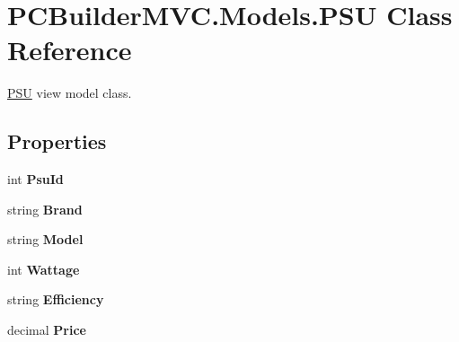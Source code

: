 \hypertarget{class_p_c_builder_m_v_c_1_1_models_1_1_p_s_u}{}\section{P\+C\+Builder\+M\+V\+C.\+Models.\+P\+SU Class Reference}
\label{class_p_c_builder_m_v_c_1_1_models_1_1_p_s_u}


\hyperlink{class_p_c_builder_m_v_c_1_1_models_1_1_p_s_u}{P\+SU} view model class.  


\subsection*{Properties}
\begin{DoxyCompactItemize}
\item 
int {\bfseries Psu\+Id}\hypertarget{class_p_c_builder_m_v_c_1_1_models_1_1_p_s_u_a1aa8f13f4f65fac57188abd27fec6361}{}\label{class_p_c_builder_m_v_c_1_1_models_1_1_p_s_u_a1aa8f13f4f65fac57188abd27fec6361}

\item 
string {\bfseries Brand}\hypertarget{class_p_c_builder_m_v_c_1_1_models_1_1_p_s_u_a6a4566057f3f1faa0a76b7523f6381b5}{}\label{class_p_c_builder_m_v_c_1_1_models_1_1_p_s_u_a6a4566057f3f1faa0a76b7523f6381b5}

\item 
string {\bfseries Model}\hypertarget{class_p_c_builder_m_v_c_1_1_models_1_1_p_s_u_ad1ce3afa398e0d81611614408e3e504c}{}\label{class_p_c_builder_m_v_c_1_1_models_1_1_p_s_u_ad1ce3afa398e0d81611614408e3e504c}

\item 
int {\bfseries Wattage}\hypertarget{class_p_c_builder_m_v_c_1_1_models_1_1_p_s_u_a1003235ba50a1a9cdce50d9e985db3d9}{}\label{class_p_c_builder_m_v_c_1_1_models_1_1_p_s_u_a1003235ba50a1a9cdce50d9e985db3d9}

\item 
string {\bfseries Efficiency}\hypertarget{class_p_c_builder_m_v_c_1_1_models_1_1_p_s_u_a3a2bf09667c2d0c6b9c44de0f9464a73}{}\label{class_p_c_builder_m_v_c_1_1_models_1_1_p_s_u_a3a2bf09667c2d0c6b9c44de0f9464a73}

\item 
decimal {\bfseries Price}\hypertarget{class_p_c_builder_m_v_c_1_1_models_1_1_p_s_u_af66a2e0cf50a961fe83f40c53692e78b}{}\label{class_p_c_builder_m_v_c_1_1_models_1_1_p_s_u_af66a2e0cf50a961fe83f40c53692e78b}

\end{DoxyCompactItemize}


